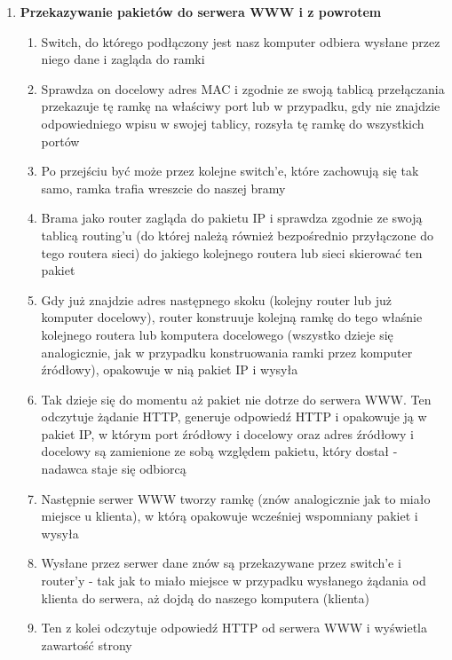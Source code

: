 \documentclass[12pt]{article}
\begin{document}
\begin{enumerate}
        \item \textbf{Przekazywanie pakietów do serwera WWW i z powrotem}
        \begin{enumerate}
            \item Switch, do którego podłączony jest nasz komputer odbiera wysłane przez niego dane i zagląda do ramki
            \item Sprawdza on docelowy adres MAC i zgodnie ze swoją tablicą przełączania przekazuje tę ramkę na właściwy port
                  lub w przypadku, gdy nie znajdzie odpowiedniego wpisu w swojej tablicy, rozsyła tę ramkę do wszystkich portów
            \item Po przejściu być może przez kolejne switch'e, które zachowują się tak samo, ramka trafia wreszcie do naszej bramy
            \item Brama jako router zagląda do pakietu IP i sprawdza zgodnie ze swoją tablicą routing'u
                  (do której należą również bezpośrednio przyłączone do tego routera sieci) do jakiego kolejnego routera lub sieci skierować ten pakiet
            \item Gdy już znajdzie adres następnego skoku (kolejny router lub już komputer docelowy), router konstruuje kolejną ramkę do tego właśnie kolejnego routera
                  lub komputera docelowego (wszystko dzieje się analogicznie, jak w przypadku konstruowania ramki przez komputer źródłowy), opakowuje w nią pakiet IP i wysyła
            \item Tak dzieje się do momentu aż pakiet nie dotrze do serwera WWW. Ten odczytuje żądanie HTTP, generuje odpowiedź HTTP i opakowuje ją w pakiet IP,
                  w którym port źródłowy i docelowy oraz adres źródłowy i docelowy są zamienione ze sobą względem pakietu, który dostał - nadawca staje się odbiorcą
            \item Następnie serwer WWW tworzy ramkę (znów analogicznie jak to miało miejsce u klienta), w którą opakowuje wcześniej wspomniany pakiet i wysyła
            \item Wysłane przez serwer dane znów są przekazywane przez switch'e i router'y - tak jak to miało miejsce w przypadku wysłanego żądania od klienta do serwera,
                  aż dojdą do naszego komputera (klienta)
            \item Ten z kolei odczytuje odpowiedź HTTP od serwera WWW i wyświetla zawartość strony
        \end{enumerate}
    \end{enumerate}
    \newpage
\end{document}
